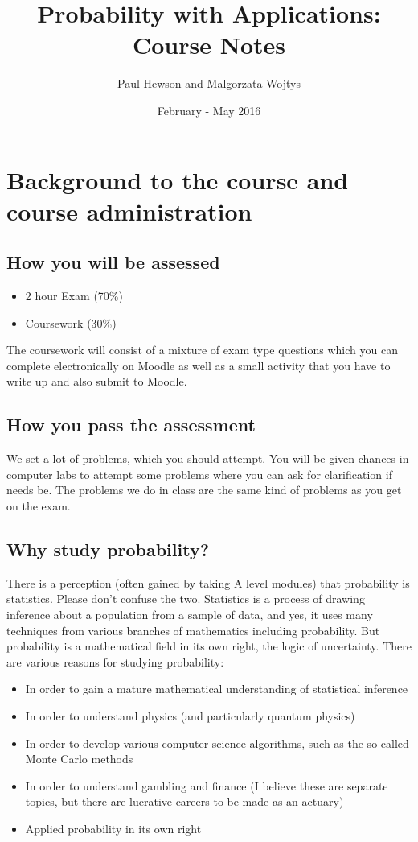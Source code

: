 \documentclass{book}
\title{Probability with Applications: Course Notes}
\author{Paul Hewson and Malgorzata Wojtys}
\date{February - May 2016}
\begin{document}
\sffamily
\onehalfspacing

\maketitle

\chapter{Background to the course and course administration}

\section{How you will be assessed}

\begin{itemize}
\item 2 hour Exam (70\%)
\item Coursework (30\%)
\end{itemize}

The coursework will consist of a mixture of exam type questions which you can complete electronically on Moodle as well as a small activity that you have to write up and also submit to Moodle.

\section{How you pass the assessment}

We set a lot of problems, which you should attempt.   You will be given chances in computer labs to attempt some problems where you can ask for clarification if needs be.   The problems we do in class are the same kind of problems as you get on the exam.

\section{Why study probability?}

There is a perception (often gained by taking A level modules) that probability is statistics.   Please don't confuse the two.   Statistics is a process of drawing inference about a population from a sample of data, and yes, it uses many techniques from various branches of mathematics including probability.   But probability is a mathematical field in its own right, the logic of uncertainty.   There are various reasons for studying probability:

\begin{itemize}
\item In order to gain a mature mathematical understanding of statistical inference
\item In order to understand physics (and particularly quantum physics)
\item In order to develop various computer science algorithms, such as the so-called Monte Carlo methods
\item In order to understand gambling and finance (I believe these are separate topics, but there are lucrative careers to be made as an actuary)
\item Applied probability in its own right
\end{itemize}
\end{document}
